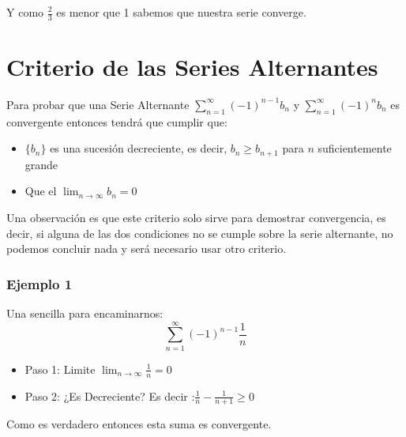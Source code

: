 \documentclass[12pt]{report}                                %
\begin{document}
            Y como $\frac{2}{3}$ es menor que 1 sabemos que nuestra serie converge.


    \clearpage
    \section{Criterio de las Series Alternantes}

        Para probar que una Serie Alternante $\sum_{n=1}^{\infty} (-1)^{n-1} b_n$ y $\sum_{n=1}^{\infty} (-1)^n b_n$ es convergente entonces tendrá que cumplir que:

        \begin{itemize}
            \item $\{b_n\}$ es una sucesión decreciente, es decir, $b_n \geq b_{n+1}$ para $n$ suficientemente grande
            \item Que el $\lim_{n \to \infty} b_n = 0$
        \end{itemize}

        Una observación es que este criterio solo sirve para demostrar convergencia, es decir, si alguna de las dos condiciones no se cumple sobre la serie alternante, no podemos concluir nada y será necesario usar otro criterio.

        \subsubsection{Ejemplo 1}
            Una sencilla para encaminarnos:
            \begin{equation*}
                \sum_{n=1}^{\infty} (-1)^{n-1} \frac{1}{n}
            \end{equation*}


             \begin{itemize}
                \item Paso 1: Limite $\lim_{n \to \infty} \frac{1}{n}=0$
                \item Paso 2: ¿Es Decreciente? Es decir :$\frac{1}{n}-\frac{1}{n+1} \geq 0 $
             \end{itemize}

            Como es verdadero entonces esta suma es convergente.
\end{document}
